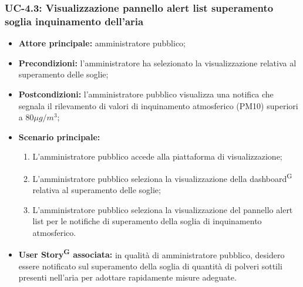 \documentclass[8pt]{article}
\newcommand{\glossterm}[1]{#1\textsuperscript{G}} %
\begin{document}
\subsubsection*{UC-4.3: Visualizzazione pannello alert list superamento soglia inquinamento dell'aria}
\begin{itemize}
    \item \textbf{Attore principale:} amministratore pubblico;
    \item \textbf{Precondizioni:} l'amministratore ha selezionato la visualizzazione relativa al superamento delle soglie;
    \item \textbf{Postcondizioni:} l’amministratore pubblico visualizza una notifica che segnala il rilevamento di valori di inquinamento atmosferico (PM10) superiori a 80$\mu g/m^3$;
    \item \textbf{Scenario principale:}
        \begin{enumerate}
        \item L’amministratore pubblico accede alla piattaforma di visualizzazione;
        \item L’amministratore pubblico seleziona la visualizzazione della \glossterm{dashboard} relativa al superamento delle soglie;
        \item L'amministratore pubblico seleziona la visualizzazione del pannello alert list per le notifiche di superamento della soglia di inquinamento atmosferico.
        \end{enumerate}
    \item \textbf{\glossterm{User Story} associata:} in qualità di amministratore pubblico, desidero essere notificato sul superamento della soglia di quantità di polveri sottili presenti nell'aria per adottare rapidamente misure adeguate.
\end{itemize}
\end{document}
